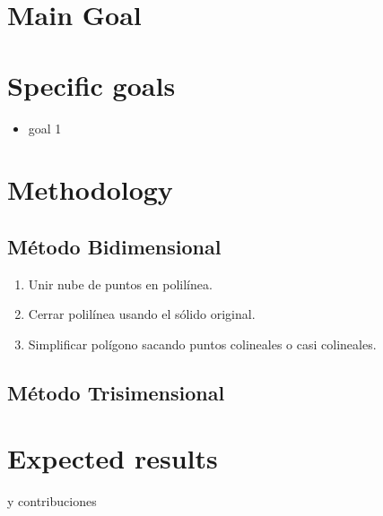 \documentclass[submission]{eptcs}
\begin{document}
\section{Main Goal}


\section{Specific goals}

\begin{itemize}
\item goal 1
\end{itemize}

\section{Methodology}

\subsection{Método Bidimensional}
\begin{enumerate}
    \item Unir nube de puntos en polilínea.
    \item Cerrar polilínea usando el sólido original.
    \item Simplificar polígono sacando puntos colineales o casi colineales.
\end{enumerate}
\subsection{Método Trisimensional}

\section{Expected results}

 y contribuciones

\nocite{*}


\end{document}
